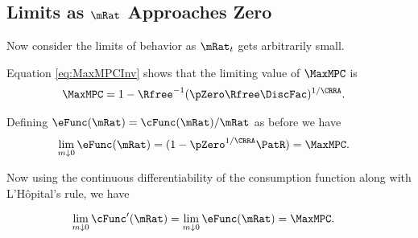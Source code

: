 \documentclass[BufferStockTheory]{subfiles}
\begin{document}

\begin{comment}
  Of course, the constraint never becomes irrelevant if human wealth is
  infinite.  We ruled out infinite human wealth at the beginning of this
  section by assuming $\Rfree> \PGro$.  If this finite human wealth
  condition does not hold, it is possible to show that for any finite
  horizon consumer the marginal propensity to consume approaches the
  finite-horizon perfect foresight MPC as wealth approaches infinity.
  However, as the horizon gets longer, the perfect foresight MPC
  approaches zero.  It can be shown therefore that the limiting MPC for
  the converged consumption function approaches (but never reaches)
  zero.  (This is why we chose $\MinMinMPC=0$ if the \FHWC~fails
  in the proofs above.)
\end{comment}

\hypertarget{LimitsAsmtToZero}{}
\subsection{Limits as $\mRat$ Approaches Zero}

\label{subsec:LimitsAsmtToZero} Now consider the limits of behavior as $\mRat_{t}$ gets
arbitrarily small.

Equation \eqref{eq:MaxMPCInv} shows that the limiting value of
$\MaxMPC$ is
\begin{align*}
  \MaxMPC  & = 1-{\Rfree}^{-1}(\pZero  \Rfree\DiscFac)^{1/\CRRA}. 
\end{align*}

Defining $\eFunc(\mRat)=\cFunc(\mRat)/\mRat$ as before we have
\begin{align*}
  \lim_{m \downarrow 0} \eFunc(\mRat)  & = (1-\pZero^{1/\CRRA}\PatR) = \MaxMPC .
\end{align*}

Now using the continuous differentiability of the consumption function
along with L'H\^opital's rule, we have
\begin{comment}
  \begin{align*}
    \eFunc^{\prime}(\mRat)  & = \mRat^{-1} \cFunc^{\prime}(\mRat) - \mRat^{-2} \cFunc(\mRat)
    \\ \mRat \eFunc^{\prime}(\mRat)  & = \cFunc^{\prime}(\mRat) - \cFunc(\mRat)/\mRat
    \\ \cFunc^{\prime}(\mRat)  & = \eFunc(\mRat)+ \mRat \eFunc^{\prime}(\mRat)
  \end{align*}
  and since $0<\eFunc(\mRat)<1$ we have
\end{comment}
\begin{align*}
  \lim_{m \downarrow 0} \cFunc^{\prime}(\mRat)  & = \lim_{m \downarrow 0}
                                                  \eFunc(\mRat) = \MaxMPC. 
\end{align*}
\end{document}
